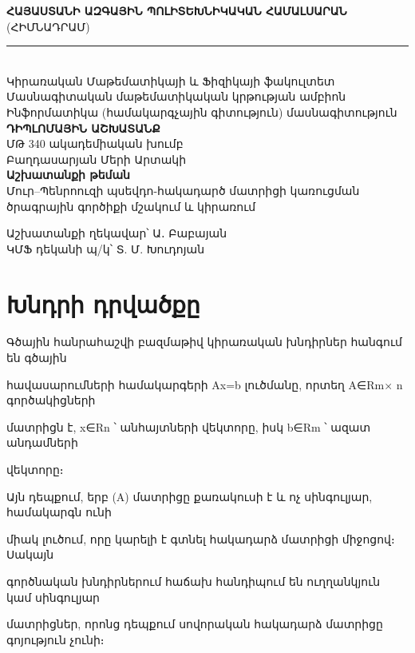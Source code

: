 \documentclass[11pt,a4paper]{article}
\begin{document}
\begin{titlepage}
\begin{center}
{\bfseries ՀԱՅԱՍՏԱՆԻ ԱԶԳԱՅԻՆ ՊՈԼԻՏԵԽՆԻԿԱԿԱՆ ՀԱՄԱԼՍԱՐԱՆ}\\[0.3em]
(ՀԻՄՆԱԴՐԱՄ)\\[1.1cm]
\rule{\textwidth}{0.4pt}\\[0.65cm]
Կիրառական Մաթեմատիկայի և Ֆիզիկայի ֆակուլտետ\\[0.3cm]
Մասնագիտական մաթեմատիկական կրթության ամբիոն\\[0.3cm]
Ինֆորմատիկա (համակարգչային գիտություն) մասնագիտություն\\[2.1cm]
{\LARGE\bfseries ԴԻՊԼՈՄԱՅԻՆ ԱՇԽԱՏԱՆՔ}\\[1.6cm]
ՄԹ 340 ակադեմիական խումբ\\[0.45cm]
Բաղդասարյան Մերի Արտակի\\[1cm]
\textbf{Աշխատանքի թեման}\\[0.4cm]
Մուր--Պենրոուզի պսեվդո-հակադարծ մատրիցի կառուցման\\
ծրագրային գործիքի մշակում և կիրառում\\[1.4cm]
\end{center}
\noindent Աշխատանքի ղեկավար՝ Ա․ Բաբայան\\[0.55cm]
ԿՄՖ դեկանի պ/կ՝ Տ. Մ. Խուդոյան
\vfill
\end{titlepage}
\tableofcontents
\clearpage




\section*{Խնդրի դրվածքը}

Գծային հանրահաշվի բազմաթիվ կիրառական խնդիրներ հանգում են գծային

հավասարումների համակարգերի Ax=b լուծմանը, որտեղ A∈Rm× n գործակիցների

մատրիցն է, x∈Rn ՝ անհայտների վեկտորը, իսկ b∈Rm ՝ ազատ անդամների




վեկտորը։




Այն դեպքում, երբ (A) մատրիցը քառակուսի է և ոչ սինգուլյար, համակարգն ունի

միակ լուծում, որը կարելի է գտնել հակադարձ մատրիցի միջոցով։ Սակայն

գործնական խնդիրներում հաճախ հանդիպում են ուղղանկյուն կամ սինգուլյար

մատրիցներ, որոնց դեպքում սովորական հակադարձ մատրիցը գոյություն չունի։
\end{document}
